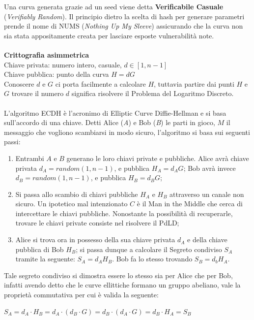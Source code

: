 \documentclass[a4paper,12pt]{tesiinfo}
\begin{document}
Una curva generata grazie ad un seed viene detta \textbf{Verificabile Casuale} (\textit{Verifiably Random}). Il principio dietro la scelta di hash per generare parametri prende il nome di NUMS (\textit{Nothing Up My Sleeve}) assicurando che la curva non sia stata appositamente creata per lasciare esposte vulnerabilit\`a note.
\\
\\
\textbf{Crittografia asimmetrica}
\\
Chiave privata: numero intero, casuale, $d \in [1, n-1]$\\
Chiave pubblica: punto della curva $H = dG$\\
Conoscere $d$ e $G$ ci porta facilmente a calcolare $H$, tuttavia partire dai punti $H$ e $G$ trovare il numero $d$ significa risolvere il Problema del Logaritmo Discreto.
\\
\\
L'algoritmo ECDH \`e l'acronimo di Elliptic Curve Diffie-Hellman e si basa sull'accordo di una chiave. Detti Alice (\textit{A}) e Bob (\textit{B}) le parti in gioco, $M$ il messaggio che vogliono scambiarsi in modo sicuro, l'algoritmo si basa sui seguenti passi:
\begin{enumerate}
    \item Entrambi $A$ e $B$ generano le loro chiavi private e pubbliche. Alice avr\`a chiave privata $d_A = random(1, n-1)$, e pubblica $H_A = d_AG$; Bob avr\`a invece $d_B = random(1, n-1)$, e pubblica $H_B = d_BG$;
    
    \item Si passa allo scambio di chiavi pubbliche $H_A$ e $H_B$ attraverso un canale non sicuro. Un ipotetico mal intenzionato $C$ \`e il Man in the Middle che cerca di intercettare le chiavi pubbliche. Nonostante la possibilit\`a di recuperarle, trovare le chiavi private consiste nel risolvere il PdLD;
    
    \item Alice si trova ora in possesso della sua chiave privata $d_A$ e della chiave pubblica di Bob $H_B$; si passa dunque a calcolare il Segreto condiviso $S_A$ tramite la seguente: $S_A = d_AH_B$. Bob fa lo stesso trovando $S_B = d_bH_A$.
\end{enumerate}
Tale segreto condiviso si dimostra essere lo stesso sia per Alice che per Bob, infatti avendo detto che le curve ellittiche formano un gruppo abeliano, vale la propriet\`a commutativa per cui \`e valida la seguente:
\begin{center}
    $S_A = d_A \cdot H_B = d_A \cdot (d_B \cdot G) = d_B \cdot (d_A \cdot G) = d_B \cdot H_A = S_B$
\end{center}
\end{document}
